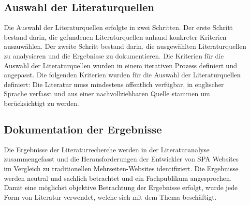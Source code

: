 \subsection{Auswahl der Literaturquellen}
Die Auswahl der Literaturquellen erfolgte in zwei Schritten.
Der erste Schritt bestand darin, die gefundenen Literaturquellen anhand konkreter Kriterien auszuwählen.
Der zweite Schritt bestand darin, die ausgewählten Literaturquellen zu analysieren und die Ergebnisse zu dokumentieren.
Die Kriterien für die Auswahl der Literaturquellen wurden in einem iterativen Prozess definiert und angepasst.
Die folgenden Kriterien wurden für die Auswahl der Literaturquellen definiert:
Die Literatur muss mindestens öffentlich verfügbar, in englischer Sprache verfasst und aus einer nachvollziehbaren Quelle stammen um berücksichtigt zu werden.


\subsection{Dokumentation der Ergebnisse}
Die Ergebnisse der Literaturrecherche werden in der Literaturanalyse zusammengefasst und die Herausforderungen der Entwickler von \ac{SPA} Websites im Vergleich zu traditionellen Mehrseiten-Websites identifiziert.
Die Ergebnisse werden neutral und sachlich betrachtet und ein Fachpublikum angesprochen.
Damit eine möglichst objektive Betrachtung der Ergebnisse erfolgt, wurde jede Form von Literatur verwendet, welche sich mit dem Thema beschäftigt.

